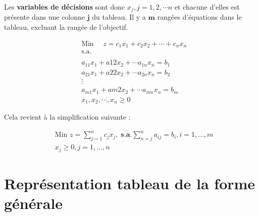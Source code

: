 \documentclass{report}
\begin{document}
\begin{multicols*}{2}
    Les \textbf{variables de décisions} sont donc $x_j, j = 1, 2, \cdots n$ et chacune 
    d'elles est 
    présente dans une colonne $\boldsymbol{j}$ du tableau. Il y a 
    $\boldsymbol{m}$  rangées d'équations 
    dans le tableau, excluant la rangée de l'objectif. 



    \begin{align*}
        &\text{Min } \quad z = c_1x_1 + c_2x_2 + \cdots + c_nx_n \\ 
        &\text{s.a.}   \\\\ 
        &a_{11}x_1 + a{12}x_2 + \cdots a_{1n}x_n = b_1 \\
        &a_{21}x_1 + a{22}x_2 + \cdots a_{2n}x_n = b_2 \\
        & \vdots  \\ 
        &a_{m1}x_1 + a{m2}x_2 + \cdots a_{mn}x_n = b_m \\
        &x_1, x_2, \cdots, x_n \geq 0 
     \end{align*}

     Cela revient à la simplification suivante :

     \begin{align*}
        &\text{Min } z = \sum_{j=1}^{n }c_jx_j, \; \textbf{s}.\textbf{a}.  
        \sum_{n=j}^{n }a_{ij} = b_i, i = 1, \dots,  m \\ 
        &x_j \geq 0, j = 1, \dots, n 
     \end{align*} 


\section{Représentation tableau de la forme générale}



\end{multicols*}
\end{document}
